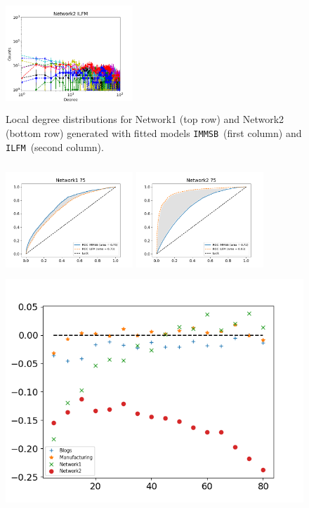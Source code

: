 \documentclass[conference]{IEEEtran}
\newcommand{\ifm}{\texttt{ILFM}}
\newcommand{\imb}{\texttt{IMMSB}}
\begin{document}
\begin{figure}[h]
\begin{minipage}{0.24\textwidth}
        \includegraphics[width=4.8cm,height=4.2cm]{img/corpus/ilfm_network2_1}
    \end{minipage}
    \caption {Local degree distributions for Network1 (top row) and Network2 (bottom row) generated with fitted models \imb\ (first column) and \ifm\ (second column).} 
\label{fig:me_local}
\end{figure}

\begin{figure}[h]
\centering
    \begin{minipage}{0.24\textwidth}
        \includegraphics[width=4.8cm,height=4.2cm]{img/corpus/roc_network1_75_f}
    \end{minipage}
    \begin{minipage}{0.24\textwidth}
        \includegraphics[width=4.8cm,height=4.2cm]{img/corpus/roc_network2_75_f}
    \end{minipage}
    \begin{minipage}{0.5\textwidth}
        \includegraphics[width=\textwidth]{img/corpus/testset_max_20.png}

\end{minipage}
\end{figure}
\end{document}
